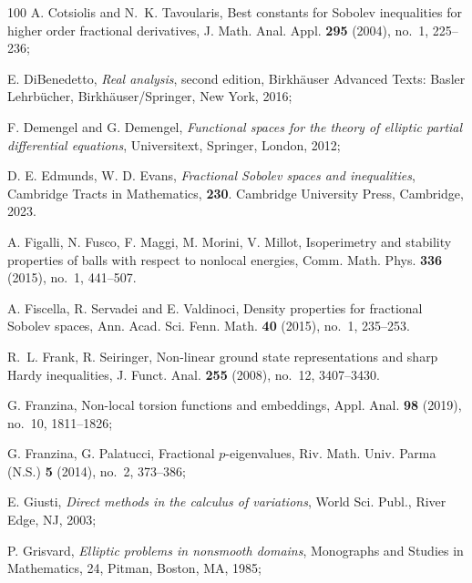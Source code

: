 \documentclass{amsart}
\theoremstyle{definition}
\numberwithin{equation}{section}
\begin{document}
\begin{thebibliography}{100}
	 A. Cotsiolis and N.~K. Tavoularis, Best constants for Sobolev inequalities for higher order fractional derivatives, J. Math. Anal. Appl. {\bf 295} (2004), no.~1, 225--236;
	
	 E. DiBenedetto, {\it Real analysis}, second edition, Birkh\"auser Advanced Texts: Basler Lehrb\"ucher, Birkh\"auser/Springer, New York, 2016; 
	
	 F. Demengel and G. Demengel, {\it Functional spaces for the theory of elliptic partial differential equations}, Universitext, Springer, London, 2012;
	
	 D. E. Edmunds, W. D. Evans, {\it Fractional Sobolev spaces and inequalities}, Cambridge Tracts in Mathematics, {\bf 230}. Cambridge University Press, Cambridge, 2023. 
	
	 A. Figalli, N. Fusco, F. Maggi, M. Morini, V. Millot,  Isoperimetry and stability properties of balls with respect to nonlocal energies, Comm. Math. Phys. {\bf 336} (2015), no.~1, 441--507.
	
	 A. Fiscella, R. Servadei and E. Valdinoci, Density properties for fractional Sobolev spaces, Ann. Acad. Sci. Fenn. Math. {\bf 40} (2015), no.~1, 235--253.
	
	 R.~L. Frank, R. Seiringer, Non-linear ground state representations and sharp Hardy inequalities, J. Funct. Anal. {\bf 255} (2008), no.~12, 3407--3430.
	
	
	
	 G. Franzina, Non-local torsion functions and embeddings, Appl. Anal. {\bf 98} (2019), no.~10, 1811--1826;
	
	 G. Franzina, G. Palatucci, Fractional $p$-eigenvalues, Riv. Math. Univ. Parma (N.S.) {\bf 5} (2014), no.~2, 373--386;
	
	
	 E. Giusti, {\it Direct methods in the calculus of variations}, World Sci. Publ., River Edge, NJ, 2003; 
	
	 P. Grisvard, {\it Elliptic problems in nonsmooth domains}, Monographs and Studies in Mathematics, 24, Pitman, Boston, MA, 1985;
	

\end{thebibliography}
\end{document}
